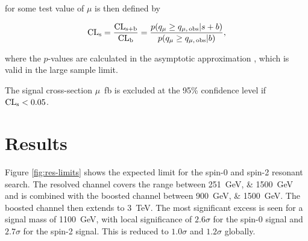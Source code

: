 \CLs for some test value of $\mu$ is then defined by

\begin{equation}
	\label{eqn:cls-def}
	\text{CL}\textsubscript{s} = \frac{\text{CL}\textsubscript{s+b}}{\text{CL}\textsubscript{b}} = \frac{p\qty({q}_{\mu} \ge {q}_{\mu,\,\text{obs}} | s + b)}{p\qty({q}_{\mu} \ge {q}_{\mu,\,\text{obs}} | b)},
\end{equation}

where the $p$-values are calculated in the asymptotic approximation
\cite{Cowan11}, which is valid in the large sample limit.

The signal cross-section {$\mu$}~\si{\femto\barn} is excluded at the 95\% confidence level if $\text{CL}\textsubscript{s} < 0.05$.

\FloatBarrier
\clearpage
\section{Results}
Figure \ref{fig:res-limits} shows the expected limit for the spin-0 and spin-2 resonant search. The 
resolved channel covers the range between \SIlist{251;1500}{\GeV} and is combined with the boosted channel between \SIlist{900;1500}{\GeV}. The boosted channel then extends to \SI{3}{\TeV}. The most significant excess is seen 
for a signal mass of \SI{1100}{\GeV}, with local significance of $2.6\sigma$ for the spin-0 signal and 
$2.7\sigma$ for the spin-2 signal. This is reduced to $1.0\sigma$ and $1.2\sigma$ globally. 

